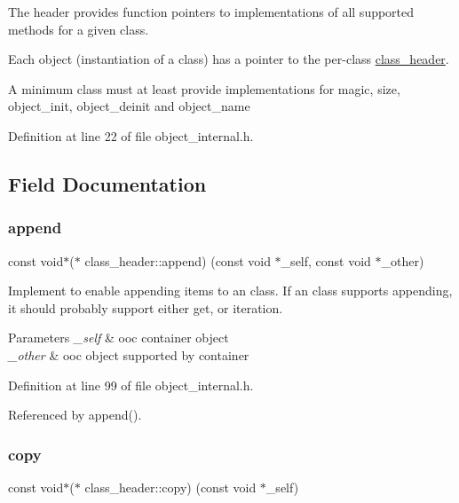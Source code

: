 The header provides function pointers to implementations of all supported methods for a given class.

Each object (instantiation of a class) has a pointer to the per-\/class \mbox{\hyperlink{structclass__header}{class\+\_\+header}}.

A minimum class must at least provide implementations for magic, size, object\+\_\+init, object\+\_\+deinit and object\+\_\+name 

Definition at line 22 of file object\+\_\+internal.\+h.



\subsection{Field Documentation}
\mbox{\label{structclass__header_a10e4c230bf810df38e3581caabad02bb}} 
\subsubsection{\texorpdfstring{append}{append}}
{\footnotesize\ttfamily const void$\ast$($\ast$ class\+\_\+header\+::append) (const void $\ast$\+\_\+self, const void $\ast$\+\_\+other)}

Implement to enable appending items to an class. If an class supports appending, it should probably support either get, or iteration.


\begin{DoxyParams}{Parameters}
{\em \+\_\+self} & ooc container object \\
\hline
{\em \+\_\+other} & ooc object supported by container \\
\hline
\end{DoxyParams}


Definition at line 99 of file object\+\_\+internal.\+h.



Referenced by append().

\mbox{\label{structclass__header_a26ec3e94c98bf5d3eff10d37cf2696ef}} 
\subsubsection{\texorpdfstring{copy}{copy}}
{\footnotesize\ttfamily const void$\ast$($\ast$ class\+\_\+header\+::copy) (const void $\ast$\+\_\+self)}

